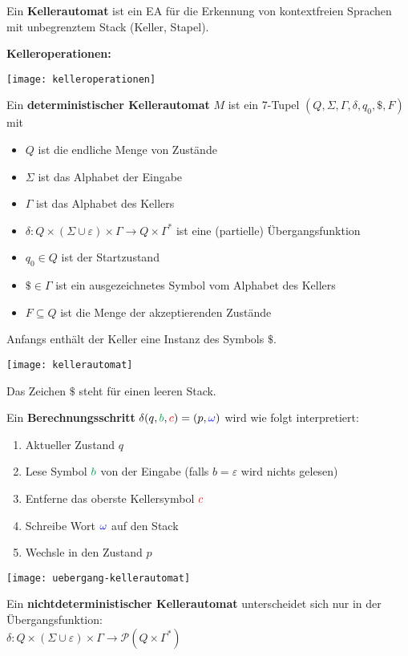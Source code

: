 
Ein \textbf{Kellerautomat} ist ein EA für die Erkennung von kontextfreien Sprachen mit unbegrenztem Stack (Keller, Stapel).

\textbf{Kelleroperationen:}

\texttt{[image: kelleroperationen]}

Ein \textbf{deterministischer Kellerautomat} $M$ ist ein 7-Tupel $(Q, \Sigma, \Gamma, \delta, q_0, \$, F)$ mit
\begin{itemize}
    \item $Q$ ist die endliche Menge von Zustände
    \item $\Sigma$ ist das Alphabet der Eingabe
    \item $\Gamma$ ist das Alphabet des Kellers
    \item $\delta: Q \times (\Sigma \cup \varepsilon) \times \Gamma \rightarrow Q \times \Gamma^*$ ist eine (partielle) Übergangsfunktion
    \item $q_0 \in Q$ ist der Startzustand
    \item $\$ \in \Gamma$ ist ein ausgezeichnetes Symbol vom Alphabet des Kellers
    \item $F \subseteq Q$ ist die Menge der akzeptierenden Zustände
\end{itemize}
Anfangs enthält der Keller eine Instanz des Symbols $\$$.

\texttt{[image: kellerautomat]}

Das Zeichen $\$$ steht für einen leeren Stack.

Ein \textbf{Berechnungsschritt} $\delta(q, \textcolor{Green}{b}, \textcolor{red}{c}) = (p, \textcolor{blue}{\omega})$ wird wie folgt interpretiert:
\begin{enumerate}
    \item Aktueller Zustand $q$
    \item Lese Symbol $\textcolor{Green}{b}$ von der Eingabe (falls $b = \varepsilon$ wird nichts gelesen)
    \item Entferne das oberste Kellersymbol $\textcolor{red}{c}$
    \item Schreibe Wort $\textcolor{blue}{\omega}$ auf den Stack
    \item Wechsle in den Zustand $p$
\end{enumerate}

\texttt{[image: uebergang-kellerautomat]}

Ein \textbf{nichtdeterministischer Kellerautomat} unterscheidet sich nur in der Übergangsfunktion:\\
$\delta: Q \times (\Sigma \cup \varepsilon) \times \Gamma \rightarrow \mathcal{P}(Q \times \Gamma^*)$

